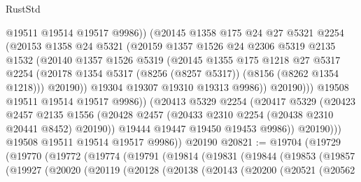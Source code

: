 \begin{lexlean}{RustStd}
\begin{coremodule}
                        @19511
                        @19514
                        @19517
                        @9986))
                    (@20145
                      @1358
                      @175
                      @24
                      @27
                      @5321
                      @2254
                      (@20153
                        @1358
                        @24
                        @5321
                        (@20159
                          @1357
                          @1526
                          @24
                          @2306
                          @5319
                          @2135
                          @1532
                          (@20140
                            @1357
                            @1526
                            @5319
                            (@20145
                              @1355
                              @175
                              @1218
                              @27
                              @5317
                              @2254
                              (@20178 @1354 @5317 (@8256 (@8257 @5317)) (@8156 (@8262 @1354 @1218)))
                              @20190))
                          @19304
                          @19307
                          @19310
                          @19313
                          @9986))
                      @20190)))
                @19508
                @19511
                @19514
                @19517
                @9986))
            (@20413
              @5329
              @2254
              (@20417
                @5329
                (@20423
                  @2457
                  @2135
                  @1556
                  (@20428 @2457 (@20433 @2310 @2254 (@20438 @2310 @20441 @8452) @20190))
                  @19444
                  @19447
                  @19450
                  @19453
                  @9986))
              @20190)))
        @19508
        @19511
        @19514
        @19517
        @9986))
    @20190
@20821 := @19704
    (@19729
      (@19770
        (@19772
          (@19774
            (@19791
              (@19814
                (@19831
                  (@19844
                    (@19853
                      (@19857
                        (@19927
                          (@20020
                            (@20119
                              (@20128
                                (@20138
                                  (@20143
                                    (@20200
                                      (@20521
                                        (@20562

\end{coremodule}
\end{lexlean}
